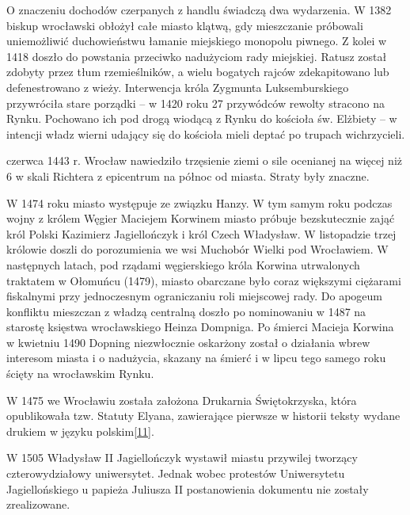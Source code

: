 \documentclass{article}
\begin{document}
\vspace{6pt}

\noindent O znaczeniu dochodów czerpanych z handlu świadczą dwa wydarzenia. W 1382 biskup wrocławski obłożył całe miasto klątwą, gdy mieszczanie próbowali uniemożliwić duchowieństwu łamanie miejskiego monopolu piwnego. Z kolei w 1418 doszło do powstania przeciwko nadużyciom rady miejskiej. Ratusz został zdobyty przez tłum rzemieślników, a wielu bogatych rajców zdekapitowano lub defenestrowano z wieży. Interwencja króla Zygmunta Luksemburskiego przywróciła stare porządki – w 1420 roku 27 przywódców rewolty stracono na Rynku. Pochowano ich pod drogą wiodącą z Rynku do kościoła św. Elżbiety – w intencji władz wierni udający się do kościoła mieli deptać po trupach wichrzycieli.

\vspace{6pt}

 czerwca 1443 r. Wrocław nawiedziło trzęsienie ziemi o sile ocenianej na więcej niż 6 w skali Richtera z epicentrum na północ od miasta. Straty były znaczne.

\vspace{6pt}

\noindent W 1474 roku miasto występuje ze związku Hanzy. W tym samym roku podczas wojny z królem Węgier Maciejem Korwinem miasto próbuje bezskutecznie zająć król Polski Kazimierz Jagiellończyk i król Czech Władysław. W listopadzie trzej królowie doszli do porozumienia we wsi Muchobór Wielki pod Wrocławiem. W następnych latach, pod rządami węgierskiego króla Korwina utrwalonych traktatem w Ołomuńcu (1479), miasto obarczane było coraz większymi ciężarami fiskalnymi przy jednoczesnym ograniczaniu roli miejscowej rady. Do apogeum konfliktu mieszczan z władzą centralną doszło po nominowaniu w 1487 na starostę księstwa wrocławskiego Heinza Dompniga. Po śmierci Macieja Korwina w kwietniu 1490 Dopning niezwłocznie oskarżony został o działania wbrew interesom miasta i o nadużycia, skazany na śmierć i w lipcu tego samego roku ścięty na wrocławskim Rynku.

\vspace{6pt}

\noindent W 1475 we Wrocławiu została założona Drukarnia Świętokrzyska, która opublikowała tzw. Statuty Elyana, zawierające pierwsze w historii teksty wydane drukiem w języku polskim\hyperref[11]{[11]}\label{111}.

\vspace{6pt}

\noindent W 1505 Władysław II Jagiellończyk wystawił miastu przywilej tworzący czterowydziałowy uniwersytet. Jednak wobec protestów Uniwersytetu Jagiellońskiego u papieża Juliusza II postanowienia dokumentu nie zostały zrealizowane.
\end{document}
